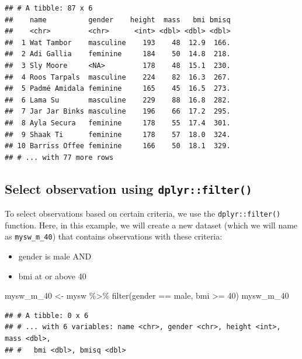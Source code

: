 \documentclass[
]{book}
\makeatletter
\newenvironment{Shaded}{\begin{snugshade}}{\end{snugshade}}
\newcommand{\DecValTok}[1]{\textcolor[rgb]{0.06,0.06,0.06}{#1}}
\newcommand{\FunctionTok}[1]{\textcolor[rgb]{0,0,0}{#1}}
\newcommand{\NormalTok}[1]{#1}
\newcommand{\OtherTok}[1]{\textcolor[rgb]{0.37,0.37,0.37}{#1}}
\newcommand{\SpecialCharTok}[1]{\textcolor[rgb]{0,0,0}{#1}}
\newcommand{\StringTok}[1]{\textcolor[rgb]{0.5,0.5,0.5}{#1}}
\providecommand{\tightlist}{%
  \setlength{\itemsep}{0pt}\setlength{\parskip}{0pt}}
\newenvironment{kframe}{%
\medskip{}
\setlength{\fboxsep}{.8em}
 \def\at@end@of@kframe{}%
 \ifinner\ifhmode%
  \def\at@end@of@kframe{\end{minipage}}%
  \begin{minipage}{\columnwidth}%
 \fi\fi%
 \def\FrameCommand##1{\hskip\@totalleftmargin \hskip-\fboxsep
 \colorbox{shadecolor}{##1}\hskip-\fboxsep
     \hskip-\linewidth \hskip-\@totalleftmargin \hskip\columnwidth}%
 \MakeFramed {\advance\hsize-\width
   \@totalleftmargin\z@ \linewidth\hsize
   \@setminipage}}%
 {\par\unskip\endMakeFramed%
 \at@end@of@kframe}
\renewenvironment{Shaded}{\begin{kframe}}{\end{kframe}}
\makeatother
\begin{document}
\begin{verbatim}
## # A tibble: 87 x 6
##    name          gender    height  mass   bmi bmisq
##    <chr>         <chr>      <int> <dbl> <dbl> <dbl>
##  1 Wat Tambor    masculine    193    48  12.9  166.
##  2 Adi Gallia    feminine     184    50  14.8  218.
##  3 Sly Moore     <NA>         178    48  15.1  230.
##  4 Roos Tarpals  masculine    224    82  16.3  267.
##  5 Padmé Amidala feminine     165    45  16.5  273.
##  6 Lama Su       masculine    229    88  16.8  282.
##  7 Jar Jar Binks masculine    196    66  17.2  295.
##  8 Ayla Secura   feminine     178    55  17.4  301.
##  9 Shaak Ti      feminine     178    57  18.0  324.
## 10 Barriss Offee feminine     166    50  18.1  329.
## # ... with 77 more rows
\end{verbatim}

\hypertarget{select-observation-using-dplyrfilter}{%
\subsection{\texorpdfstring{Select observation using \texttt{dplyr::filter()}}{Select observation using dplyr::filter()}}\label{select-observation-using-dplyrfilter}}

To select observations based on certain criteria, we use the \texttt{dplyr::filter()} function. Here, in this example, we will create a new dataset (which we will name as \texttt{mysw\_m\_40}) that contains observations with these criteria:

\begin{itemize}
\tightlist
\item
  gender is male AND
\item
  bmi at or above 40
\end{itemize}

\begin{Shaded}
\begin{Highlighting}[]
\NormalTok{mysw\_m\_40 }\OtherTok{\textless{}{-}}\NormalTok{ mysw }\SpecialCharTok{\%\textgreater{}\%} \FunctionTok{filter}\NormalTok{(gender }\SpecialCharTok{==} \StringTok{\textquotesingle{}male\textquotesingle{}}\NormalTok{, bmi }\SpecialCharTok{\textgreater{}=} \DecValTok{40}\NormalTok{)}
\NormalTok{mysw\_m\_40}
\end{Highlighting}
\end{Shaded}

\begin{verbatim}
## # A tibble: 0 x 6
## # ... with 6 variables: name <chr>, gender <chr>, height <int>, mass <dbl>,
## #   bmi <dbl>, bmisq <dbl>
\end{verbatim}
\end{document}
